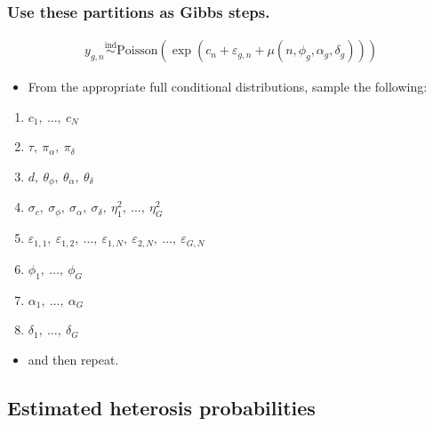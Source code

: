 \documentclass[handout]{beamer}
\providecommand{\e}{\varepsilon}
\numberwithin{equation}{section}
\begin{document}
\begin{frame}
\frametitle{Use these partitions as Gibbs steps.} \small

\begin{align*}
y_{g,n} \stackrel{\text{ind}}{\sim} \text{Poisson}( \exp(c_n + \e_{g, n} + \mu(n, \phi_g, \alpha_g, \delta_g)))
\end{align*}

\begin{itemize}
\item From the appropriate full conditional distributions, sample the following:
\end{itemize}


\begin{enumerate}
\item $c_1, \ \ldots, \ c_N$
\pause \item $\tau, \ \pi_\alpha, \ \pi_\delta$
\pause \item $d, \ \theta_\phi, \ \theta_\alpha, \ \theta_\delta$
\pause \item $\sigma_c, \ \sigma_\phi, \ \sigma_\alpha, \ \sigma_\delta, \ \eta_1^2, \ \ldots, \ \eta_G^2$
\pause \item $\e_{1, 1}, \ \e_{1, 2}, \ \ldots, \ \e_{1, N}, \ \e_{2, N}, \ \ldots, \ \e_{G, N}$
\pause \item $\phi_1, \ \ldots, \ \phi_G$
\pause \item $\alpha_1, \ \ldots, \ \alpha_G$
\pause \item $\delta_1, \ \ldots, \ \delta_G$
\end{enumerate}
\begin{itemize}
\item and then repeat.
\end{itemize}
\end{frame}

\subsection{Estimated heterosis probabilities}
\end{document}
